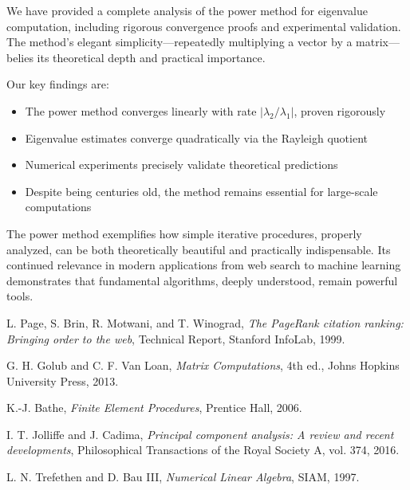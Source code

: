 \documentclass[11pt,a4paper]{article}
\begin{document}
We have provided a complete analysis of the power method for eigenvalue computation, including rigorous convergence proofs and experimental validation. The method's elegant simplicity—repeatedly multiplying a vector by a matrix—belies its theoretical depth and practical importance.

Our key findings are:
\begin{itemize}
    \item The power method converges linearly with rate $|\lambda_2/\lambda_1|$, proven rigorously
    \item Eigenvalue estimates converge quadratically via the Rayleigh quotient
    \item Numerical experiments precisely validate theoretical predictions
    \item Despite being centuries old, the method remains essential for large-scale computations
\end{itemize}

The power method exemplifies how simple iterative procedures, properly analyzed, can be both theoretically beautiful and practically indispensable. Its continued relevance in modern applications from web search to machine learning demonstrates that fundamental algorithms, deeply understood, remain powerful tools.

\begin{thebibliography}{9}

L. Page, S. Brin, R. Motwani, and T. Winograd,
\textit{The PageRank citation ranking: Bringing order to the web},
Technical Report, Stanford InfoLab, 1999.

G. H. Golub and C. F. Van Loan,
\textit{Matrix Computations}, 4th ed.,
Johns Hopkins University Press, 2013.

K.-J. Bathe,
\textit{Finite Element Procedures},
Prentice Hall, 2006.

I. T. Jolliffe and J. Cadima,
\textit{Principal component analysis: A review and recent developments},
Philosophical Transactions of the Royal Society A, vol. 374, 2016.

L. N. Trefethen and D. Bau III,
\textit{Numerical Linear Algebra},
SIAM, 1997.

\end{thebibliography}
\end{document}

